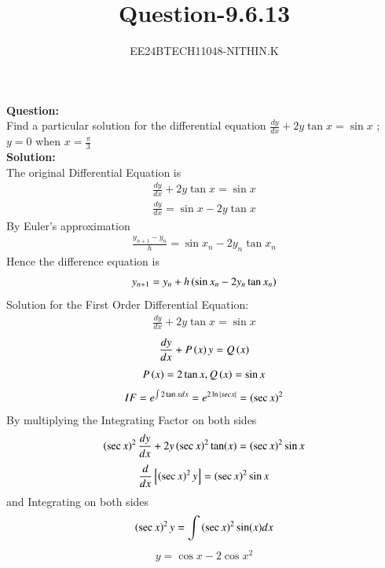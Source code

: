 \documentclass[journal]{IEEEtran}
\numberwithin{equation}{enumi}
\numberwithin{figure}{enumi}
\begin{document}


\title{Question-9.6.13}
\author{EE24BTECH11048-NITHIN.K} 
{\let\newpage\relax\maketitle}
\textbf{Question:} \\
Find a particular solution for the differential equation $\frac{dy}{dx} + 2y\tan x = \sin x$ ; $y = 0$ when $x = \frac{\pi}{3}$ \\
\textbf{Solution:} \\
The original Differential Equation is \\
\begin{align}
	\frac{dy}{dx} + 2y\tan x = \sin x
\end{align}
\begin{align}
	\frac{dy}{dx} = \sin x - 2y\tan x
\end{align}
By Euler's approximation
\begin{align}                                                                   
	\frac{y_{n+1} - y_n}{h} = \sin x_n - 2y_n\tan x_n 
\end{align}
Hence the difference equation is
\begin{align}
	y_{n+1} = y_n + h\left(\sin x_n - 2y_n\tan x_n\right)
\end{align}
Solution for the First Order Differential Equation:
\begin{align}
	\frac{dy}{dx} + 2y\tan x = \sin x
\end{align}
\begin{align}
	\frac{dy}{dx} + P\left(x\right)y = Q\left(x\right)
\end{align}
\begin{align}
	P\left(x\right) = 2\tan x , Q\left(x\right) = \sin x
\end{align}
\begin{align}
	IF = e^{\int2\tan x dx} = e^{2\ln|secx|} = \left(\sec x\right)^2
\end{align}
By multiplying the Integrating Factor on both sides
\begin{align}
	\left(\sec x\right)^2\frac{dy}{dx} + 2y\left(\sec x\right)^2\tan(x) = \left(\sec x\right)^2\sin x
\end{align}
\begin{align}
	\frac{d}{dx}{}\left[\left(\sec x\right)^2y\right] = \left(\sec x\right)^2\sin x
\end{align}
and Integrating on both sides
\begin{align}
	\left(\sec x\right)^2y = \int\left(\sec x\right)^2\sin(x)dx
\end{align}
\begin{align}
	y = \cos x - 2{\cos x}^2
\end{align}
\end{document}
